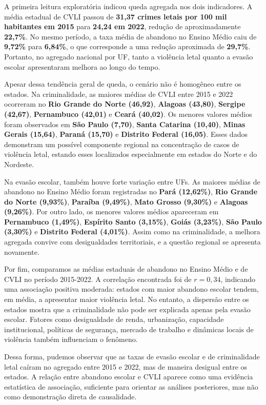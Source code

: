 \documentclass[10pt]{article}
\begin{document}
A primeira leitura exploratória indicou queda agregada nos dois indicadores. A média estadual de CVLI passou de \textbf{31,37 crimes letais por 100 mil habitantes em 2015} para \textbf{24,24 em 2022}, redução de aproximadamente \textbf{22,7\%}. No mesmo período, a taxa média de abandono no Ensino Médio caiu de \textbf{9,72\%} para \textbf{6,84\%}, o que corresponde a uma redução aproximada de \textbf{29,7\%}. Portanto, no agregado nacional por UF, tanto a violência letal quanto a evasão escolar apresentaram melhora ao longo do tempo.

Apesar dessa tendência geral de queda, o cenário não é homogêneo entre os estados. Na criminalidade, as maiores médias de CVLI entre 2015 e 2022 ocorreram no \textbf{Rio Grande do Norte (46,92)}, \textbf{Alagoas (43,80)}, \textbf{Sergipe (42,67)}, \textbf{Pernambuco (42,01)} e \textbf{Ceará (40,02)}. Os menores valores médios foram observados em \textbf{São Paulo (7,70)}, \textbf{Santa Catarina (10,40)}, \textbf{Minas Gerais (15,64)}, \textbf{Paraná (15,70)} e \textbf{Distrito Federal (16,05)}. Esses dados demonstram um possível componente regional na concentração de casos de violência letal, estando esses localizados especialmente em estados do Norte e do Nordeste.

Na evasão escolar, também houve forte variação entre UFs. As maiores médias de abandono no Ensino Médio foram registradas no \textbf{Pará (12,62\%)}, \textbf{Rio Grande do Norte (9,93\%)}, \textbf{Paraíba (9,49\%)}, \textbf{Mato Grosso (9,30\%)} e \textbf{Alagoas (9,26\%)}. Por outro lado, os menores valores médios apareceram em \textbf{Pernambuco (1,49\%)}, \textbf{Espírito Santo (3,15\%)}, \textbf{Goiás (3,23\%)}, \textbf{São Paulo (3,30\%)} e \textbf{Distrito Federal (4,01\%)}. Assim como na criminalidade, a melhora agregada convive com desigualdades territoriais, e a questão regional se apresenta novamente.

Por fim, comparamos as médias estaduais de abandono no Ensino Médio e de CVLI no período 2015-2022. A correlação encontrada foi de \textbf{$r = 0,34$}, indicando uma associação positiva moderada: estados com maior abandono escolar tendem, em média, a apresentar maior violência letal. No entanto, a dispersão entre os estados mostra que a criminalidade não pode ser explicada apenas pela evasão escolar. Fatores como desigualdade de renda, urbanização, capacidade institucional, políticas de segurança, mercado de trabalho e dinâmicas locais de violência também influenciam o fenômeno.

Dessa forma, pudemos observar que as taxas de evasão escolar e de criminalidade letal caíram no agregado entre 2015 e 2022, mas de maneira desigual entre os estados. A relação entre abandono escolar e CVLI aparece como uma evidência estatística de associação, suficiente para orientar as análises posteriores, mas não como demonstração direta de causalidade.
\end{document}
